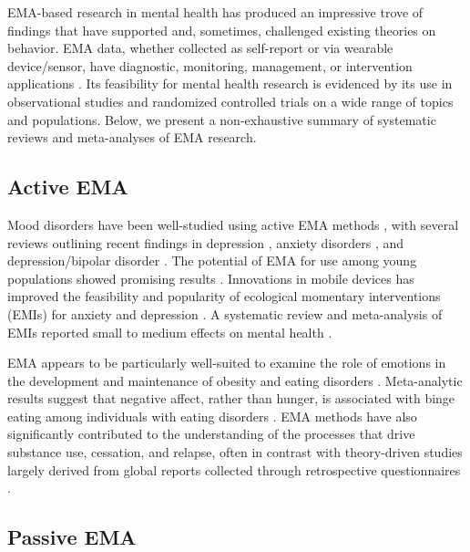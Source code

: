 \documentclass[]{book}
\begin{document}
EMA-based research in mental health has produced an impressive trove of
findings that have supported and, sometimes, challenged existing
theories on behavior. EMA data, whether collected as self-report or via
wearable device/sensor, have diagnostic, monitoring, management, or
intervention applications \citep{Patel2012, Aung2017, Evenson2015}. Its
feasibility for mental health research is evidenced by its use in
observational studies and randomized controlled trials on a wide range
of topics and populations. Below, we present a non-exhaustive summary of
systematic reviews and meta-analyses of EMA research.

\subsection{Active EMA}\label{active-ema}


Mood disorders have been well-studied using active EMA methods
\citep{Wenze2010}, with several reviews outlining recent findings in
depression \citep{Telford2012, Wichers2011, burton2013}, anxiety
disorders \citep{Walz2014}, and depression/bipolar disorder
\citep{AanhetRot2012}. The potential of EMA for use among young
populations showed promising results \citep{Dubad2018}. Innovations in
mobile devices has improved the feasibility and popularity of ecological
momentary interventions (EMIs) for anxiety and depression
\citep{schueller2017}. A systematic review and meta-analysis of EMIs
reported small to medium effects on mental health \citep{Versluis2016}.

EMA appears to be particularly well-suited to examine the role of
emotions in the development and maintenance of obesity and eating
disorders \citep{Engel2016}. Meta-analytic results suggest that negative
affect, rather than hunger, is associated with binge eating among
individuals with eating disorders \citep{Haedt2011, Haedt2012}. EMA
methods have also significantly contributed to the understanding of the
processes that drive substance use, cessation, and relapse, often in
contrast with theory-driven studies largely derived from global reports
collected through retrospective questionnaires
\citep{Shiffman2009, Swendsen2016}.

\subsection{Passive EMA}\label{passive-ema}

\end{document}
